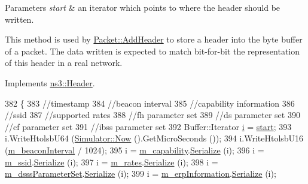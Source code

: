 \begin{DoxyParams}{Parameters}
{\em start} & an iterator which points to where the header should be written.\\
\hline
\end{DoxyParams}
This method is used by \hyperlink{classns3_1_1Packet_a465108c595a0bc592095cbcab1832ed8}{Packet\+::\+Add\+Header} to store a header into the byte buffer of a packet. The data written is expected to match bit-\/for-\/bit the representation of this header in a real network. 

Implements \hyperlink{classns3_1_1Header_afb61f1aac69ff8349a6bfe521fab5404}{ns3\+::\+Header}.


\begin{DoxyCode}
382 \{
383   \textcolor{comment}{//timestamp}
384   \textcolor{comment}{//beacon interval}
385   \textcolor{comment}{//capability information}
386   \textcolor{comment}{//ssid}
387   \textcolor{comment}{//supported rates}
388   \textcolor{comment}{//fh parameter set}
389   \textcolor{comment}{//ds parameter set}
390   \textcolor{comment}{//cf parameter set}
391   \textcolor{comment}{//ibss parameter set}
392   Buffer::Iterator \hyperlink{bernuolliDistribution_8m_a6f6ccfcf58b31cb6412107d9d5281426}{i} = \hyperlink{namespacevisualizer_1_1core_a2a35e5d8a34af358b508dac8635754e0}{start};
393   i.WriteHtolsbU64 (\hyperlink{classns3_1_1Simulator_ac3178fa975b419f7875e7105be122800}{Simulator::Now} ().GetMicroSeconds ());
394   i.WriteHtolsbU16 (\hyperlink{classns3_1_1MgtProbeResponseHeader_a1108654897bdae0b2de2380319662246}{m\_beaconInterval} / 1024);
395   i = \hyperlink{classns3_1_1MgtProbeResponseHeader_ae3da012e14970d6cab1e7066e023a0cd}{m\_capability}.\hyperlink{classns3_1_1CapabilityInformation_ae2671dc343fe7d7a756ef5915f2f6aa8}{Serialize} (i);
396   i = \hyperlink{classns3_1_1MgtProbeResponseHeader_a68c26b26d0329128db85f8f151bdbfb6}{m\_ssid}.\hyperlink{classns3_1_1WifiInformationElement_a2f43932681fae6e2bc7a978e9493811e}{Serialize} (i);
397   i = \hyperlink{classns3_1_1MgtProbeResponseHeader_a830a4f67265f50c20a24e2977ee408ba}{m\_rates}.\hyperlink{classns3_1_1WifiInformationElement_a2f43932681fae6e2bc7a978e9493811e}{Serialize} (i);
398   i = \hyperlink{classns3_1_1MgtProbeResponseHeader_ac3bfab499bbf8d4a3bbcc96204177b43}{m\_dsssParameterSet}.\hyperlink{classns3_1_1DsssParameterSet_a5720c8b974f0c5080247330056d17201}{Serialize} (i);
399   i = \hyperlink{classns3_1_1MgtProbeResponseHeader_af9f812dcdf09e14f3c7b53c7faff4a63}{m\_erpInformation}.\hyperlink{classns3_1_1ErpInformation_a797d76e95ddcd5e6b0cad49443b2c356}{Serialize} (i);

\end{DoxyCode}
